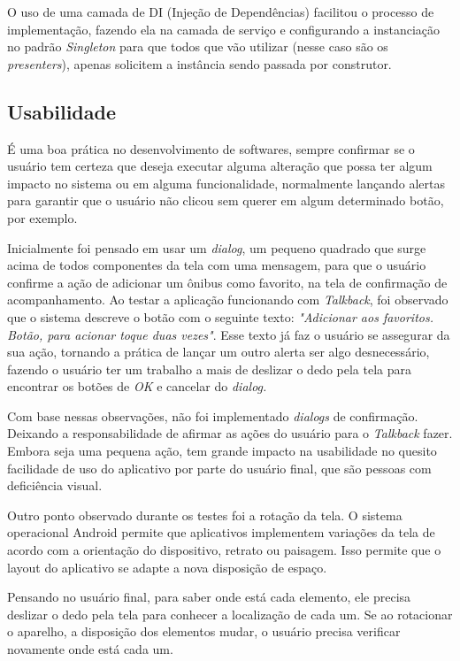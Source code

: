 \documentclass[
	12pt,				%
	oneside,			%
	a4paper,			%
	brazil				%
]{abntex2}
\begin{document}
O uso de uma camada de DI (Injeção de Dependências) facilitou o processo de implementação, fazendo ela na camada de serviço e configurando a instanciação no padrão \textit{Singleton} para que todos que vão utilizar (nesse caso são os \textit{presenters}), apenas solicitem a instância sendo passada por construtor.

\subsection{Usabilidade}

É uma boa prática no desenvolvimento de softwares, sempre confirmar se o usuário tem certeza que deseja executar alguma alteração que possa ter algum impacto no sistema ou em alguma funcionalidade, normalmente lançando alertas para garantir que o usuário não clicou sem querer em algum determinado botão, por exemplo. 

Inicialmente foi pensado em usar um \textit{dialog}, um pequeno quadrado que surge acima de todos componentes da tela com uma mensagem, para que o usuário confirme a ação de adicionar um ônibus como favorito, na tela de confirmação de acompanhamento. Ao testar a aplicação funcionando com \textit{Talkback}, foi observado que o sistema descreve o botão com o seguinte texto: \textit{"Adicionar aos favoritos. Botão, para acionar toque duas vezes"}. Esse texto já faz o usuário se assegurar da sua ação, tornando a prática de lançar um outro alerta ser algo desnecessário, fazendo o usuário ter um trabalho a mais de deslizar o dedo pela tela para encontrar os botões de \textit{OK} e cancelar do \textit{dialog.}

Com base nessas observações, não foi implementado \textit{dialogs} de confirmação. Deixando a responsabilidade de afirmar as ações do usuário para o \textit{Talkback} fazer. Embora seja uma pequena ação, tem grande impacto na usabilidade no quesito facilidade de uso do aplicativo por parte do usuário final, que são pessoas com deficiência visual.

Outro ponto observado durante os testes foi a rotação da tela. O sistema operacional Android permite que aplicativos implementem variações da tela de acordo com a orientação do dispositivo, retrato ou paisagem. Isso permite que o layout do aplicativo se adapte a nova disposição de espaço.

Pensando no usuário final, para saber onde está cada elemento, ele precisa deslizar o dedo pela tela para conhecer a localização de cada um. Se ao rotacionar o aparelho, a disposição dos elementos mudar, o usuário precisa verificar novamente onde está cada um.
\end{document}
